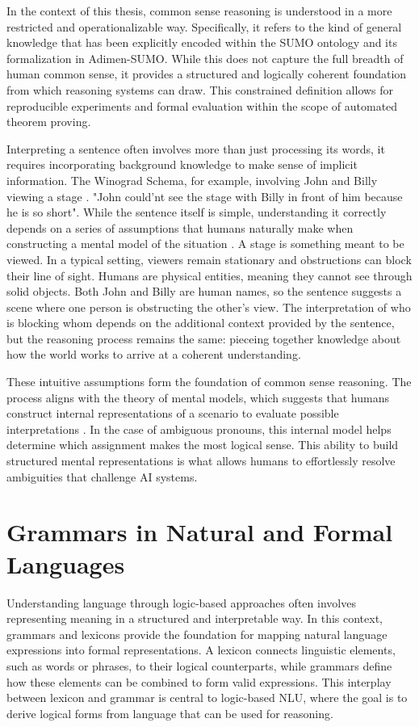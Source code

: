 \documentclass[english,version-2020-11]{uzl-thesis}
\begin{document}
In the context of this thesis, common sense reasoning is understood in a more restricted and operationalizable way. Specifically, it refers to the kind of general knowledge that has been explicitly encoded within the SUMO ontology and its formalization in Adimen-SUMO. While this does not capture the full breadth of human common sense, it provides a structured and logically coherent foundation from which reasoning systems can draw. This constrained definition allows for reproducible experiments and formal evaluation within the scope of automated theorem proving.

Interpreting a sentence often involves more than just processing its words, it requires incorporating background knowledge to make sense of implicit information. The Winograd Schema, for example, involving John and Billy viewing a stage \cite{Levesque2012}. 
"John could'nt see the stage with Billy in front of him because he is so short".
While the sentence itself is simple, understanding it correctly depends on a series of assumptions that humans naturally make when constructing a mental model of the situation \cite{Bayerkuhnlein2023}. A stage is something meant to be viewed. In a typical setting, viewers remain stationary and obstructions can block their line of sight. Humans are physical entities, meaning they cannot see through solid objects. Both John and Billy are human names, so the sentence suggests a scene where one person is obstructing the other’s view. The interpretation of who is blocking whom depends on the additional context provided by the sentence, but the reasoning process remains the same: pieceing together knowledge about how the world works to arrive at a coherent understanding.

These intuitive assumptions form the foundation of common sense reasoning. The process aligns with the theory of mental models, which suggests that humans construct internal representations of a scenario to evaluate possible interpretations \cite{JohnsonLaird1989}. In the case of ambiguous pronouns, this internal model helps determine which assignment makes the most logical sense. This ability to build structured mental representations is what allows humans to effortlessly resolve ambiguities that challenge AI systems.

\section{Grammars in Natural and Formal Languages}

Understanding language through logic-based approaches often involves representing meaning in a structured and interpretable way. In this context, grammars and lexicons provide the foundation for mapping natural language expressions into formal representations. A lexicon connects linguistic elements, such as words or phrases, to their logical counterparts, while grammars define how these elements can be combined to form valid expressions. This interplay between lexicon and grammar is central to logic-based NLU, where the goal is to derive logical forms from language that can be used for reasoning.
\end{document}
